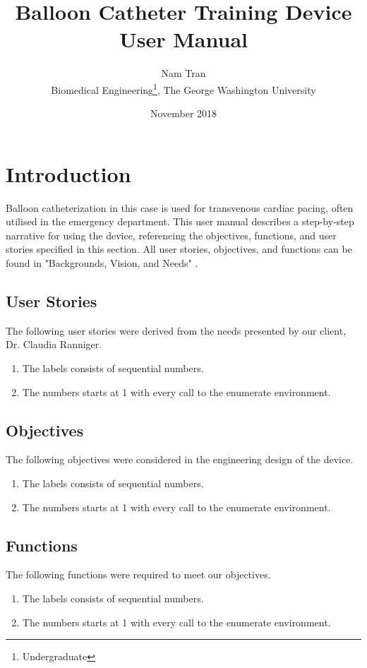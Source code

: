 \documentclass[titlepage]{article}
\title{Balloon Catheter Training Device User Manual}
\author{Nam Tran\\ Biomedical Engineering\thanks{Undergraduate}, The George Washington University}
\date{November 2018}
\begin{document}
\maketitle

\section{Introduction}
Balloon catheterization in this case is used for transvenous cardiac pacing, often utilised in the emergency department. This user manual describes a step-by-step narrative for using the device, referencing the objectives, functions, and user stories specified in this section. All user stories, objectives, and functions can be found in "Backgrounds, Vision, and Needs" \cite{backgroundreport}.

\subsection{User Stories}
The following user stories were derived from the needs presented by our client, Dr. Claudia Ranniger.

\begin{enumerate}
  \item The labels consists of sequential numbers.
  \item The numbers starts at 1 with every call to the enumerate environment.
\end{enumerate}


\subsection{Objectives}
The following objectives were considered in the engineering design of the device.

\begin{enumerate}
  \item The labels consists of sequential numbers.
  \item The numbers starts at 1 with every call to the enumerate environment.
\end{enumerate}


\subsection{Functions}
The following functions were required to meet our objectives.

\begin{enumerate}
  \item The labels consists of sequential numbers.
  \item The numbers starts at 1 with every call to the enumerate environment.
\end{enumerate}
\end{document}

